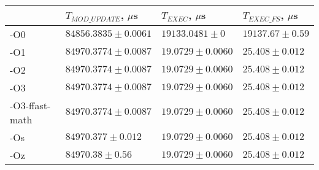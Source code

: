 \begin{tabular}{llll}
\toprule
 & $T_{MOD\_UPDATE}$, $\mu$s & $T_{EXEC}$, $\mu$s & $T_{EXEC\_FS}$, $\mu$s \\
\midrule
-O0 & $84856.3835 \pm 0.0061$ & $19133.0481 \pm 0$ & $19137.67 \pm 0.59$ \\
-O1 & $84970.3774 \pm 0.0087$ & $19.0729 \pm 0.0060$ & $25.408 \pm 0.012$ \\
-O2 & $84970.3774 \pm 0.0087$ & $19.0729 \pm 0.0060$ & $25.408 \pm 0.012$ \\
-O3 & $84970.3774 \pm 0.0087$ & $19.0729 \pm 0.0060$ & $25.408 \pm 0.012$ \\
-O3-ffast-math & $84970.3774 \pm 0.0087$ & $19.0729 \pm 0.0060$ & $25.408 \pm 0.012$ \\
-Os & $84970.377 \pm 0.012$ & $19.0729 \pm 0.0060$ & $25.408 \pm 0.012$ \\
-Oz & $84970.38 \pm 0.56$ & $19.0729 \pm 0.0060$ & $25.408 \pm 0.012$ \\
\bottomrule
\end{tabular}

